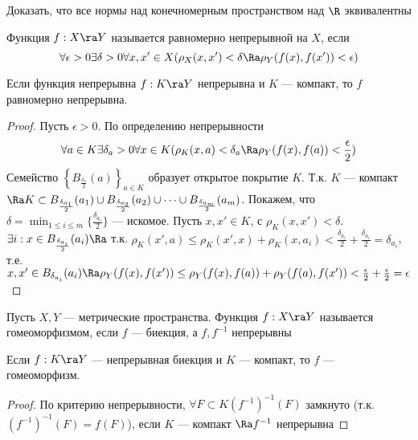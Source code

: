 
\begin{problem}
    Доказать, что все нормы над конечномерным пространством над \(\R\) эквивалентны
\end{problem}

\begin{definition}
    Функция \(f: X \ra Y\) называется равномерно непрерывной на \(X\), если
    \[\forall \epsilon > 0 \exists \delta > 0 \forall x, x' \in X (\rho_X(x, x') < \delta \Ra \rho_Y(f(x), f(x')) < \epsilon)\]
\end{definition}

\begin{theorem}[Кантор]
    Если функция непрерывна \(f: K \ra Y\) непрерывна и \(K\) --- компакт, то \(f\) равномерно непрерывна.
\end{theorem}
\begin{proof}
    Пусть \(\epsilon > 0\). По определению непрерывности
    \[\forall a \in K \exists \delta_a > 0 \forall x \in K (\rho_K(x, a) < \delta_a \Ra \rho_Y(f(x), f(a)) < \frac{\epsilon}{2})\]
    Семейство \(\left\{B_\frac{\delta_a}{2}(a)\right\}_{a \in K}\) образует открытое покрытие \(K\). Т.к. \(K\) --- компакт \(\Ra K \subset B_{\frac{\delta_{a_1}}{2}}(a_1) \cup B_{\frac{\delta_{a_2}}{2}}(a_2) \cup \dots \cup B_{\frac{\delta_{a_m}}{2}}(a_m)\). Покажем, что \(\delta = \min_{1 \le i \le m}\{\frac{\delta_{a_i}}{2}\}\) --- искомое. Пусть \(x, x' \in K\), с \(\rho_K(x, x') < \delta\). \(\exists i: x \in B_{\frac{\delta_{a_i}}{2}}(a_i) \Ra\) т.к. \(\rho_K(x', a) \le \rho_K(x', x) + \rho_K(x, a_i) < \frac{\delta_{a_i}}{2} + \frac{\delta_{a_i}}{2} = \delta_{a_i}\), т.е. \(x, x' \in B_{\delta_{a_i}}(a_i) \Ra \rho_Y(f(x), f(x')) \le \rho_Y(f(x), f(a)) + \rho_Y(f(a), f(x')) < \frac{\epsilon}{2} + \frac{\epsilon}{2} = \epsilon\)
\end{proof}

\begin{definition}
    Пусть \(X, Y\) --- метрические пространства. Функция \(f: X \ra Y\) называется гомеоморфизмом, если \(f\) --- биекция, а \(f, f^{-1}\) непрерывны
\end{definition}

\begin{theorem}
    Если \(f: K \ra Y\) --- непрерывная биекция и \(K\) --- компакт, то \(f\) --- гомеоморфизм.
\end{theorem}
\begin{proof}
    По критерию непрерывности, \(\forall F \subset K (f^{-1})^{-1}(F)\) замкнуто (т.к. \((f^{-1})^{-1}(F) = f(F)\)), если \(K\) --- компакт \(\Ra f^{-1}\) непрерывна
\end{proof}

